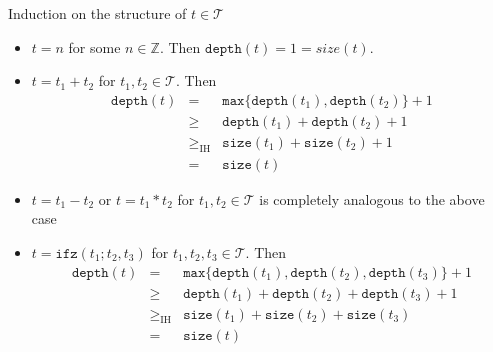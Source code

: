 \documentclass{article}
\begin{document}
Induction on the structure of $t\in\mathcal{T}$
\begin{itemize}
\item $t = n$ for some $n\in\mathbb{Z}$. Then $\mathtt{depth}(t) = 1 = size(t)$.
\item $t = t_1 + t_2$ for $t_1, t_2\in\mathcal{T}$. Then 
  \begin{align*}
    \mathtt{depth}(t) & =  &\mathtt{max}\{\mathtt{depth}(t_1), \mathtt{depth}(t_2)\} + 1\\
    & \geq & \mathtt{depth}(t_1) + \mathtt{depth}(t_2) + 1 \\
    & \geq_{\text{IH}} & \mathtt{size}(t_1) + \mathtt{size}(t_2) + 1 \\
    & = & \mathtt{size}(t)
  \end{align*}
\item $t = t_1 - t_2$ or $t = t_1 * t_2$ for $t_1, t_2\in\mathcal{T}$ is completely analogous to the above case
\item $t = \mathtt{ifz}(t_1;t_2,t_3)$ for $t_1,t_2,t_3\in\mathcal{T}$. Then
  \begin{align*}
  \mathtt{depth}(t) & = & \mathtt{max}\{\mathtt{depth}(t_1),\mathtt{depth}(t_2),\mathtt{depth}(t_3)\} + 1\\
  & \geq & \mathtt{depth}(t_1) + \mathtt{depth}(t_2) + \mathtt{depth}(t_3) + 1 \\
  & \geq_{\text{IH}} & \mathtt{size}(t_1) + \mathtt{size}(t_2) + \mathtt{size}(t_3) \\ 
  & = & \mathtt{size}(t)
  \end{align*}
\end{itemize}
\end{document}
